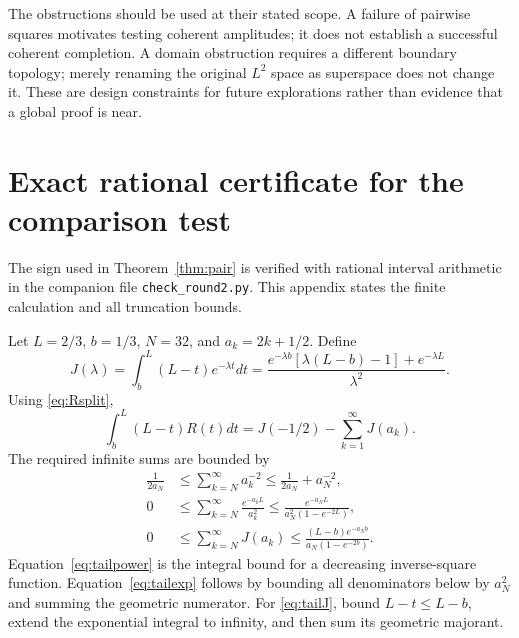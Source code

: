 \documentclass[11pt]{article}
\numberwithin{equation}{section}
\theoremstyle{definition}
\theoremstyle{remark}
\begin{document}
The obstructions should be used at their stated scope. A failure of
pairwise squares motivates testing coherent amplitudes; it does not
establish a successful coherent completion. A domain obstruction
requires a different boundary topology; merely renaming the original
$L^2$ space as superspace does not change it. These are design constraints
for future explorations rather than evidence that a global proof is near.

\appendix
\section{Exact rational certificate for the comparison test}
\label{app:certificate}

The sign used in Theorem~\ref{thm:pair} is verified with rational interval
arithmetic in the companion file \texttt{check\_round2.py}. This appendix
states the finite calculation and all truncation bounds.

Let $L=2/3$, $b=1/3$, $N=32$, and $a_k=2k+1/2$. Define
\begin{equation}
J(\lambda)=\int_b^L(L-t)e^{-\lambda t}dt
=\frac{e^{-\lambda b}[\lambda(L-b)-1]+e^{-\lambda L}}{\lambda^2}.
\end{equation}
Using \eqref{eq:Rsplit},
\begin{equation}
\int_b^L(L-t)R(t)dt=J(-1/2)-\sum_{k=1}^\infty J(a_k).
\end{equation}
The required infinite sums are bounded by
\begin{align}
\frac1{2a_N}
&\leq\sum_{k=N}^\infty a_k^{-2}
\leq\frac1{2a_N}+a_N^{-2},\label{eq:tailpower}\\
0&\leq\sum_{k=N}^\infty\frac{e^{-a_kL}}{a_k^2}
\leq\frac{e^{-a_NL}}{a_N^2(1-e^{-2L})},\label{eq:tailexp}\\
0&\leq\sum_{k=N}^\infty J(a_k)
\leq\frac{(L-b)e^{-a_Nb}}{a_N(1-e^{-2b})}.\label{eq:tailJ}
\end{align}
Equation~\eqref{eq:tailpower} is the integral bound for a decreasing
inverse-square function. Equation~\eqref{eq:tailexp} follows by bounding
all denominators below by $a_N^2$ and summing the geometric numerator.
For \eqref{eq:tailJ}, bound $L-t\leq L-b$, extend the exponential
integral to infinity, and then sum its geometric majorant.
\end{document}
